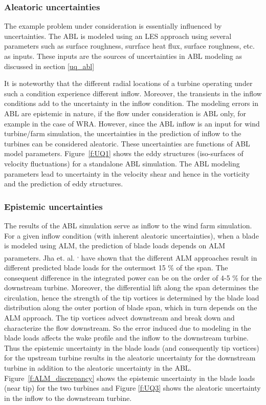 \documentclass[]{aiaa-tc}%
\begin{document}
\subsubsection{Aleatoric uncertainties}

The example problem under consideration is essentially influenced by uncertainties. The ABL is modeled using an LES approach\cite{churchfield:aiaa2012} using several parameters such as surface roughness, surrface heat flux, surface roughness, etc. as inputs. These inputs are the sources of uncertainties in ABL modeling as discussed in section \ref{uq_abl}

It is noteworthy that the different radial locations of a turbine operating under such a condition experience different inflow. Moreover, the transients in the inflow conditions add to the uncertainty in the inflow condition. The modeling errors in ABL are epistemic in nature, if the flow under consideration is ABL only, for example in the case of WRA. However, since the ABL inflow is an input for wind turbine/farm simulation, the uncertainties in the prediction of inflow to the turbines can be considered aleatoric. These uncertainties are functions of ABL model parameters. Figure~\ref{f:UQ1} shows the eddy structures (iso-surfaces of velocity fluctuations) for a standalone ABL simulation. The ABL modeling parameters lead to uncertainty in the velocity shear and hence in the vorticity and the prediction of eddy structures.

\subsubsection{Epistemic uncertainties}

The results of the ABL simulation serve as inflow to the wind farm simulation. For a given inflow condition (with inherent aleatoric uncertainties), when a blade is modeled using ALM, the prediction of blade loads depends on ALM parameters. Jha et. al. \cite{jha:aiaa2014}\textsuperscript{, }\cite{jha:jsee2014} have shown that the different ALM approaches result in different predicted blade loads for the outermost 15 \% of the span. The consequent difference in the integrated power can be on the order of 4-5 \% for the downstream turbine. Moreover, the differential lift along the span determines the circulation, hence the strength of the tip vortices is determined by the blade load distribution along the outer portion of blade span, which in turn depends on the ALM approach. The tip vortices advect downstream and break down and characterize the flow downstream. So the error induced due to modeling in the blade loads affects the wake profile and the inflow to the downstream turbine. Thus the epistemic uncertainty in the blade loads (and consequently tip vortices) for the upstream turbine results in the aleatoric uncertainty for the downstream turbine in addition to the aleatoric uncertainty in the ABL. Figure~\ref{f:ALM_discrepancy} shows the epistemic uncertainty in the blade loads (near tip) for the two turbines and Figure \ref{f:UQ3} shows the aleatoric uncertainty in the inflow to the downstream turbine.
\end{document}
